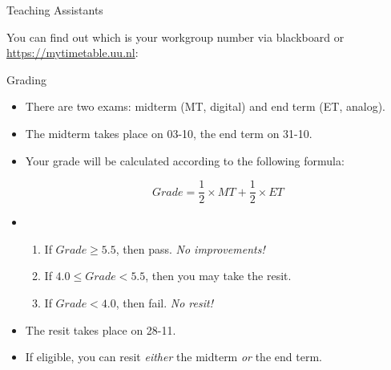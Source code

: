 \begin{frame}{Teaching Assistants}

You can find out which is your workgroup number via blackboard or \url{https://mytimetable.uu.nl}:
{\small \begin{center}
\TAS
\end{center}}


\end{frame}

\begin{frame}{Grading}

	\begin{itemize}[<+->]

		\item There are two exams: midterm (MT, digital) and end term (ET, analog).

		\item The midterm takes place on 03-10, the end term on 31-10.

		\item Your grade will be calculated according to the following formula:

			\[Grade=\frac{1}{2}\times MT+\frac{1}{2}\times ET\]

		\item \begin{enumerate}[<+->]

				\item If $Grade\geq 5.5$, then pass. \emph{No improvements!}

				\item If $4.0\leq Grade<5.5$, then you may take the resit.

				\item If $Grade<4.0$, then fail. \emph{No resit!}

			\end{enumerate}

		\item The resit takes place on 28-11.

		\item If eligible, you can resit \emph{either} the midterm \emph{or} the end term.

	\end{itemize}

\end{frame}

